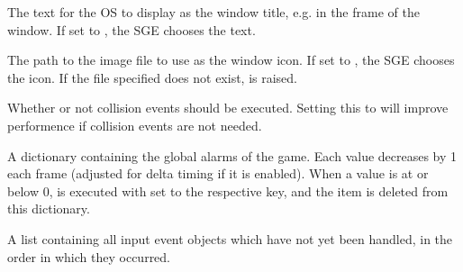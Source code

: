 \documentclass[letterpaper,10pt,english]{sphinxmanual}
\begin{document}
\begin{fulllineitems}
\begin{fulllineitems}
\end{fulllineitems}


\begin{fulllineitems}
\label{dsp:sge.dsp.Game.window_text}
The text for the OS to display as the window title, e.g. in the
frame of the window.  If set to , the SGE chooses
the text.

\end{fulllineitems}


\begin{fulllineitems}
\label{dsp:sge.dsp.Game.window_icon}
The path to the image file to use as the window icon.  If set
to , the SGE chooses the icon.  If the file
specified does not exist,  is raised.

\end{fulllineitems}


\begin{fulllineitems}
\label{dsp:sge.dsp.Game.collision_events_enabled}
Whether or not collision events should be executed.  Setting this
to  will improve performence if collision events
are not needed.

\end{fulllineitems}


\begin{fulllineitems}
\label{dsp:sge.dsp.Game.alarms}
A dictionary containing the global alarms of the game.  Each
value decreases by 1 each frame (adjusted for delta timing if it
is enabled).  When a value is at or below 0,
{\hyperref[dsp:sge.dsp.Game.event_alarm]{\emph{}}} is executed with 
set to the respective key, and the item is deleted from this
dictionary.

\end{fulllineitems}


\begin{fulllineitems}
\label{dsp:sge.dsp.Game.input_events}
A list containing all input event objects which have not yet been
handled, in the order in which they occurred.


\end{fulllineitems}
\end{fulllineitems}
\end{document}
